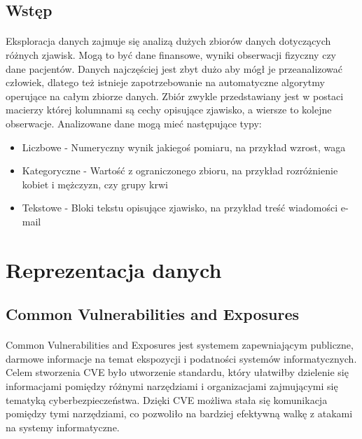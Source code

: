 \documentclass[a4paper,12pt,twoside]{article}
\begin{document}
\subsection{Wstęp}
\paragraph{}
Eksploracja danych zajmuje się analizą dużych zbiorów danych dotyczących różnych zjawisk. Mogą to być dane finansowe, wyniki obserwacji fizyczny czy dane pacjentów. Danych najczęściej jest zbyt dużo aby mógł je przeanalizować człowiek, dlatego też istnieje zapotrzebowanie na automatyczne algorytmy operujące na całym zbiorze danych. Zbiór zwykle przedstawiany jest w postaci macierzy której kolumnami są cechy opisujące zjawisko, a wiersze to kolejne obserwacje. Analizowane dane mogą mieć następujące typy:
\begin{itemize}
    \item Liczbowe - Numeryczny wynik jakiegoś pomiaru, na przykład wzrost, waga
    \item Kategoryczne - Wartość z ograniczonego zbioru, na przykład rozróżnienie kobiet i mężczyzn, czy grupy krwi
    \item Tekstowe - Bloki tekstu opisujące zjawisko, na przykład treść wiadomości e-mail 
\end{itemize}
\paragraph{}
\newpage
\thispagestyle{empty}
\mbox{}

\newpage
\section{Reprezentacja danych}
\subsection{Common Vulnerabilities and Exposures}
\paragraph{}
Common Vulnerabilities and Exposures jest systemem zapewniającym publiczne, darmowe informacje na temat ekspozycji i podatności systemów informatycznych. Celem stworzenia CVE było utworzenie standardu, który ułatwiłby dzielenie się informacjami pomiędzy różnymi narzędziami i organizacjami zajmującymi się tematyką cyberbezpieczeństwa. Dzięki CVE możliwa stała się komunikacja pomiędzy tymi narzędziami, co pozwoliło na bardziej efektywną walkę z atakami na systemy informatyczne. 
\end{document}
